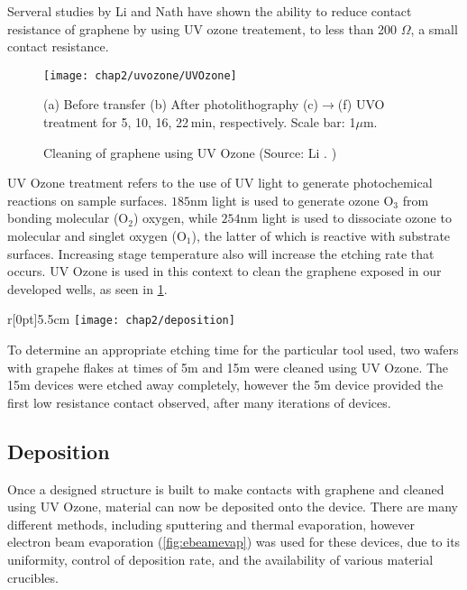 \documentclass[../../Matt_Gebert_Honours_Thesis.tex]{subfiles}
\begin{document}
	Serveral studies by Li \etal\cite{li_ultraviolet/ozone_2013} and Nath \etal\cite{nath_achieving_2014,nath_search_2016} have shown the ability to reduce contact resistance of graphene by using UV ozone treatement, to less than 200 $\Omega$, a small contact resistance.
	
	\begin{figure}[H]
		\centering
		\texttt{[image: chap2/uvozone/UVOzone]}
		\caption[Cleaning of graphene using UV Ozone]{Cleaning of graphene using UV Ozone (Source: Li \etal. \cite{li_ultraviolet/ozone_2013})}\label{fig:UV_ozone} (a) Before transfer (b) After photolithography  (c)$\to$(f) UVO treatment for 5, 10, 16, 22 min, respectively. Scale bar: 1$\mu$m.
	\end{figure}
	
	UV Ozone treatment refers to the use of UV light to generate photochemical reactions on sample surfaces. $185$nm light is used to generate ozone O$_3$ from bonding molecular (O$_2$) oxygen, while $254$nm light is used to dissociate ozone to molecular and singlet oxygen (O$_1$), the latter of which is reactive with substrate surfaces. Increasing stage temperature also will increase the etching rate that occurs. UV Ozone is used in this context to clean the graphene exposed in our developed wells, as seen in \cref{fig:UV_ozone}.
	
	\begin{wrapfigure}[13]{r}[0pt]{5.5cm}
		\vspace{-0.5cm}
		\centering
		\texttt{[image: chap2/deposition]}
		\caption[E-beam evaporation]{E-beam evaporation (Source: \cite{noauthor_understanding_nodate})}\label{fig:ebeamevap}
	\end{wrapfigure}
	
	To determine an appropriate etching time for the particular tool used, two wafers with grapehe flakes at times of 5m and 15m were cleaned using UV Ozone. The 15m devices were etched away completely, however the 5m device provided the first low resistance contact observed, after many iterations of devices.
	
	
	\subsection{Deposition}\label{sec:deposition}

	Once a designed structure is built to make contacts with graphene and cleaned using UV Ozone, material can now be deposited onto the device. There are many different methods, including sputtering and thermal evaporation, however electron beam evaporation (\cref{fig:ebeamevap}) was used for these devices, due to its uniformity, control of deposition rate, and the availability of various material crucibles.
	
\end{document}

